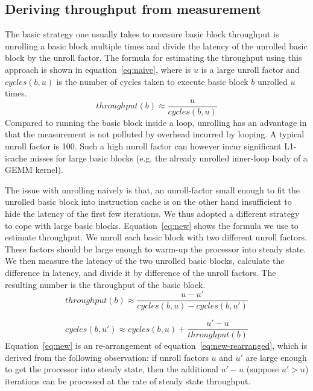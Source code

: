 \subsection{Deriving throughput from measurement}
The basic strategy one usually takes to measure basic block throughput
is unrolling a basic block multiple times and divide the latency of the
unrolled basic block by the unroll factor.
The formula for estimating the throughput using this approach is shown
in equation~\ref{eq:naive}, where is $u$ is a large unroll factor
and $\mathit{cycles}(b,u)$ is the number of cycles taken to execute basic block $b$
unrolled $u$ times.
\begin{equation}
\mathit{throughput}(b) \approx \frac{u}{\mathit{cycles}(b,u)}
\label{eq:naive}
\end{equation}
Compared to running the basic block inside a loop,
unrolling has an advantage in that the measurement is not polluted by
overhead incurred by looping.
A typical unroll factor is 100\cite{ithemal,uops}.
Such a high unroll factor can however incur significant
L1-icache misses for large basic blocks
(e.g. the already unrolled inner-loop body of a GEMM kernel).

The issue with unrolling naively is that,
an unroll-factor small enough to fit the 
unrolled basic block into instruction cache is on the other hand
insufficient to hide the latency of the first few iterations.
We thus adopted a different strategy to cope with large basic blocks.
Equation~\ref{eq:new} shows the formula we use to estimate throughput.
We unroll each basic block with two different unroll factors.
These factors should be large enough 
to warm-up the processor into steady state.
We then measure the latency of the two unrolled basic blocks,
calculate the difference in latency, and divide it 
by difference of the unroll factors.
The resulting number is the throughput of the basic block.
\begin{equation}
\mathit{throughput}(b) \approx 
\frac{u-u'}{\mathit{cycles}(b, u) - \mathit{cycles}(b, u')}
\label{eq:new}
\end{equation}

\begin{equation}
\mathit{cycles}(b, u') \approx 
\mathit{cycles}(b, u) + \frac{u'-u}{\mathit{throughput(b)}}
\label{eq:new-rearranged}
\end{equation}
Equation~\ref{eq:new} is an re-arrangement of equation~\ref{eq:new-rearranged},
which is derived from the following observation:
if unroll factors $u$ and $u'$ are large enough
to get the processor into steady state,
then the additional $u'-u$ (suppose $u' > u$) iterations can be processed at 
the rate of steady state throughput.

